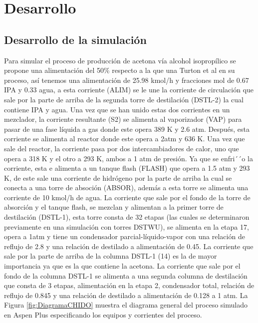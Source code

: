 \section*{Desarrollo}
    \subsection*{Desarrollo de la simulación}
    Para simular el proceso de producción de acetona vía alcohol isopropílico se propone una alimentación del 50\% respecto a la que una Turton et al en su proceso, así tenemos una alimentación de 25.98 kmol/h y fracciones mol de 0.67 IPA y 0.33 agua, a esta corriente (ALIM) se le une la corriente de circulación que sale por la parte de arriba de la segunda torre de destilación (DSTL-2) la cual contiene IPA y agua. Una vez que se han unido estas dos corrientes en un mezclador, la corriente resultante (S2) se alimenta al vaporizador (VAP) para pasar de una fase líquida a gas donde este opera 389 K y 2.6 atm. Después, esta corriente se alimenta al reactor donde este opera a 2atm y 636 K. Una vez que sale del reactor, la corriente pasa por dos intercambiadores de calor, uno que opera a 318 K y el otro a 293 K, ambos a 1 atm de presión. Ya que se enfri´´o la corriente, esta e alimenta a un tanque flash (FLASH) que opera a 1.5 atm y 293 K, de este sale una corriente de hidrógeno por la parte de arriba la cual se conecta a una torre de absoción (ABSOR), además a esta torre se alimenta una corriente de 10 kmol/h de agua. La corriente que sale por el fondo de la torre de absorción y el tanque flash, se mezclan y alimentan a la primer torre de destilación (DSTL-1), esta torre consta de 32 etapas (las cuales se determinaron previamente en una simulación con torres DSTWU), se alimenta en la etapa 17, opera a 1atm y tiene un condensador parcial-líquido-vapor con una relación de reflujo de 2.8 y una relación de destilado a alimentación de 0.45. La corriente que sale por la parte de arriba de la columna DSTL-1 (14) es la de mayor importancia ya que es la que contiene la acetona. La corriente que sale por el fondo de la columna DSTL-1 se alimenta a una segunda columna de destilación que consta de 3 etapas, alimentación en la etapa 2, condensador total, relación de reflujo de 0.845 y una relación de destilado a alimentación de 0.128 a 1 atm. La Figura \ref{fig:DiagramaCHIDO} muestra el diagrama general del proceso simulado en Aspen Plus especificando los equipos y corrientes del proceso.

